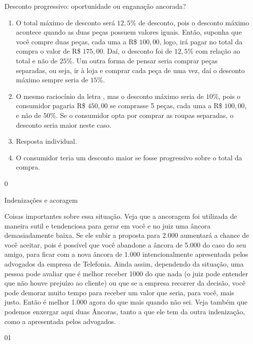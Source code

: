 \begin{answer}{Desconto progressivo: oportunidade ou enganação ancorada?}
{
  \begin{enumerate}
    \item O total máximo de desconto será $12{,}5$\% de desconto, pois o desconto máximo acontece quando as duas peças possuem valores iguais. Então, suponha que você compre duas peças, cada uma a R\$ $100{,}00$, logo, irá pagar no total da compra o valor de R\$ $175{,}00$. Daí, o desconto foi de $12{,}5$\% com relação ao total e não de $25$\%. Um outra forma de pensar seria comprar peças separadas, ou seja, ir à loja e comprar cada peça de uma vez, daí o desconto máximo sempre seria de $15$\%.
    \item O mesmo raciocínio da letra , mas o desconto máximo seria de $10$\%, pois o consumidor pagaria R\$ $450{,}00$ se comprasse 5 peças, cada uma a R\$ $100{,}00$, e não de $50$\%. Se o consumidor opta por comprar as roupas separadas, o desconto seria maior neste caso.
    \item Resposta individual.
    \item O consumidor teria um desconto maior se fosse progressivo sobre o total da compra.
  \end{enumerate}  
}{0}
\end{answer}
\begin{sugestions}{Indenizações e acoragem}
{
Coisas importantes sobre essa situação. Veja que a ancoragem foi utilizada de maneira sutil e tendenciosa para gerar em você e no juiz uma âncora demasiadamente baixa. Se ele subir a proposta para 2.000 aumentará a chance de você aceitar, pois é possível que você abandone a âncora de 5.000 do caso do seu amigo, para ficar com a nova âncora de 1.000 intencionalmente apresentada pelos advogados da empresa de Telefonia. 
Ainda assim, dependendo da situação, uma pessoa pode avaliar que é melhor receber 1000 do que nada (o juiz pode entender que não houve prejuízo ao cliente) ou que se a empresa recorrer da decisão, você pode demorar muito tempo para receber um valor que seria, para você, mais justo. Então é melhor 1.000 agora do que mais quando não sei. 
Veja também que podemos enxergar aqui duas Âncoras, tanto a que ele tem da outra indenização, como a apresentada pelos advogados. 

}{0}{1}
\end{sugestions}

\label{fin-prac-9}

